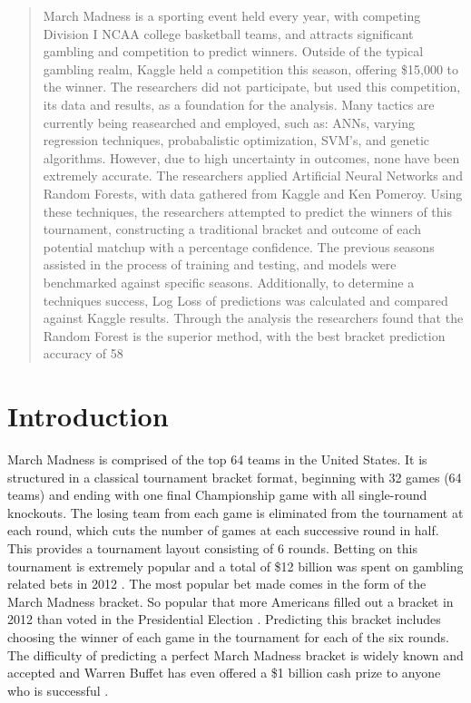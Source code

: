 \documentclass[conference]{IEEEtran}
\begin{document}
\begin{abstract}
March Madness is a sporting event held every year, with competing Division I NCAA college basketball teams, and attracts significant gambling and competition to predict winners.
Outside of the typical gambling realm, Kaggle held a competition this season, offering \$15,000 to the winner.
The researchers did not participate, but used this competition, its data and results, as a foundation for the analysis.
Many tactics are currently being reasearched and employed, such as: ANNs, varying regression techniques, probabalistic optimization, SVM's, and genetic algorithms.
However, due to high uncertainty in outcomes, none have been extremely accurate.
The researchers applied Artificial Neural Networks and Random Forests, with data gathered from Kaggle and Ken Pomeroy.
Using these techniques, the researchers attempted to predict the winners of this tournament, constructing a traditional bracket and outcome of each potential matchup with a percentage confidence.
The previous seasons assisted in the process of training and testing, and models were benchmarked against specific seasons.
Additionally, to determine a techniques success, Log Loss of predictions was calculated and compared against Kaggle results.
Through the analysis the researchers found that the Random Forest is the superior method, with the best bracket prediction accuracy of 58%
\end{abstract}


\section{Introduction}
March Madness is comprised of the top 64 teams in the United States.
It is structured in a classical tournament bracket format, beginning with 32 games (64 teams) and ending with one final Championship game with all single-round knockouts.
The losing team from each game is eliminated from the tournament at each round, which cuts the number of games at each successive round in half.
This provides a tournament layout consisting of 6 rounds.
Betting on this tournament is extremely popular and a total of \$12 billion was spent on gambling related bets in 2012 \cite{BradTuttle-2012}. 
The most popular bet made comes in the form of the March Madness bracket. So popular that more Americans filled out a bracket in 2012 than voted in the Presidential Election \cite{DavidHolmes-2013}. 
Predicting this bracket includes choosing the winner of each game in the tournament for each of the six rounds. 
The difficulty of predicting a perfect March Madness bracket is widely known and accepted and Warren Buffet has even offered a \$1 billion cash prize to anyone who is successful \cite{wbuff_bill}.
\end{document}
